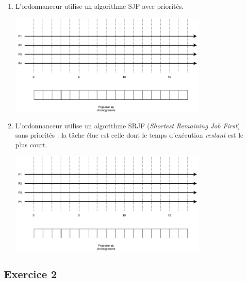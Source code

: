 \documentclass[12pt,a4paper,article,english,firamath]{nsi}
\begin{document}
\begin{enumerate}
    \item L'ordonnanceur utilise un algorithme SJF avec priorités.
            \begin{center}
            \includegraphics[width=10cm]{img/mc}\\
            \end{center}
        
     \item L'ordonnanceur utilise un algorithme SRJF (\textit{Shortest Remaining Job First}) sans priorités : la tâche élue est celle dont le temps d'exécution \textit{restant} est le plus court.
                 \begin{center}
                 \includegraphics[width=10cm]{img/mc}\\
                 \end{center}
\end{enumerate}

\subsection*{Exercice 2}
\end{document}

